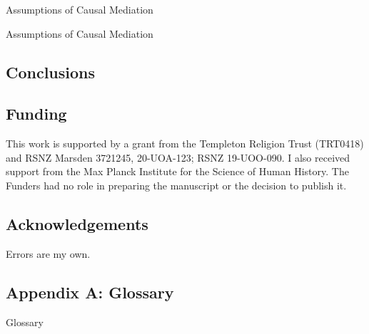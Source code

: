 \documentclass[
  single column]{article}
\begin{document}
\newpage{}

\begin{table}

\caption{\label{tbl-pearltable}Assumptions of Causal Mediation}

\centering{

\pearltable

}

\end{table}%

\newpage{}

\begin{table}

\caption{\label{tbl-swigtabledeveloped}Assumptions of Causal Mediation}

\centering{

\swigtabledeveloped

}

\end{table}%

\subsection{Conclusions}\label{conclusions}

\subsection{Funding}\label{funding}

This work is supported by a grant from the Templeton Religion Trust
(TRT0418) and RSNZ Marsden 3721245, 20-UOA-123; RSNZ 19-UOO-090. I also
received support from the Max Planck Institute for the Science of Human
History. The Funders had no role in preparing the manuscript or the
decision to publish it.

\subsection{Acknowledgements}\label{acknowledgements}

Errors are my own.

\subsection{Appendix A: Glossary}\label{appendix-a-glossary}

\begin{table}

\caption{\label{tbl-gloassary}Glossary}

\centering{

\glossaryTerms

}

\end{table}%
\end{document}
